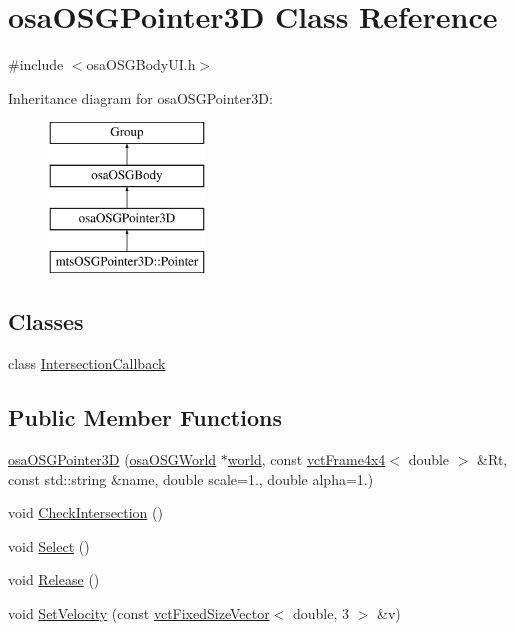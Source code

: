 \hypertarget{classosa_o_s_g_pointer3_d}{}\section{osa\+O\+S\+G\+Pointer3\+D Class Reference}
\label{classosa_o_s_g_pointer3_d}


{\ttfamily \#include $<$osa\+O\+S\+G\+Body\+U\+I.\+h$>$}

Inheritance diagram for osa\+O\+S\+G\+Pointer3\+D\+:\begin{figure}[H]
\begin{center}
\leavevmode
\includegraphics[height=4.000000cm]{d4/dc4/classosa_o_s_g_pointer3_d}
\end{center}
\end{figure}
\subsection*{Classes}
\begin{DoxyCompactItemize}
\item 
class \hyperlink{classosa_o_s_g_pointer3_d_1_1_intersection_callback}{Intersection\+Callback}
\end{DoxyCompactItemize}
\subsection*{Public Member Functions}
\begin{DoxyCompactItemize}
\item 
\hyperlink{classosa_o_s_g_pointer3_d_ab3ac4146d29dbee143442e45d5291ebb}{osa\+O\+S\+G\+Pointer3\+D} (\hyperlink{classosa_o_s_g_world}{osa\+O\+S\+G\+World} $\ast$\hyperlink{classosa_o_s_g_pointer3_d_a6576d36096a1c3a9127fbf9dbafee677}{world}, const \hyperlink{classvct_frame4x4}{vct\+Frame4x4}$<$ double $>$ \&Rt, const std\+::string \&name, double scale=1., double alpha=1.)
\item 
void \hyperlink{classosa_o_s_g_pointer3_d_aa51e8dc14f22a449c93a78d873f6475f}{Check\+Intersection} ()
\item 
void \hyperlink{classosa_o_s_g_pointer3_d_a31f316426965bb26f8f60038ec3cec09}{Select} ()
\item 
void \hyperlink{classosa_o_s_g_pointer3_d_a5992e455b2cf10becf0c53c68d2675c6}{Release} ()
\item 
void \hyperlink{classosa_o_s_g_pointer3_d_ad4ae75b60655b5f3cfec87548a4a3648}{Set\+Velocity} (const \hyperlink{classvct_fixed_size_vector}{vct\+Fixed\+Size\+Vector}$<$ double, 3 $>$ \&v)
\end{DoxyCompactItemize}

